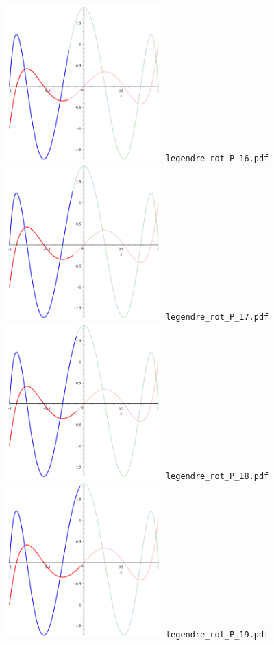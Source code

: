 \documentclass[a4paper]{amsart}
\begin{document}
\includegraphics[width=6cm]{legendre_rot_P_16.pdf}\verb+ legendre_rot_P_16.pdf+\\
\includegraphics[width=6cm]{legendre_rot_P_17.pdf}\verb+ legendre_rot_P_17.pdf+\\
\includegraphics[width=6cm]{legendre_rot_P_18.pdf}\verb+ legendre_rot_P_18.pdf+\\
\includegraphics[width=6cm]{legendre_rot_P_19.pdf}\verb+ legendre_rot_P_19.pdf+\\
\end{document}
